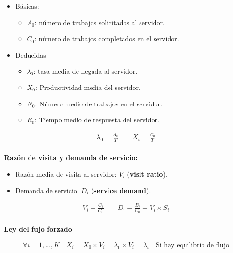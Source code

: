 \documentclass[a4paper,12pt]{article}
\begin{document}
\begin{itemize}
    \item Básicas:
    \begin{itemize}
        \item $A_0$: número de trabajos solicitados al servidor.
        \item $C_0$: número de trabajos completados en el servidor.
    \end{itemize}
    \item Deducidas:
    \begin{itemize}
        \item $\lambda_0$: tasa media de llegada al servidor.
        \item $X_0$: Productividad media del servidor.
        \item $N_0$: Número medio de trabajos en el servidor.
        \item $R_0$: Tiempo medio de respuesta del servidor. 
    \end{itemize}
\end{itemize}
\begin{tcolorbox}[colback=yellow!5!white, colframe=yellow!75!black]
    \begin{align*}
        \lambda_0 = \frac{A_0}{T} \quad \quad X_i = \frac{C_0}{T} \\
    \end{align*}
\end{tcolorbox}

\newpage
\textbf{Razón de visita y demanda de servicio:}

\begin{itemize}
    \item Razón media de visita al servidor: $V_i$ (\textbf{visit ratio}).
    \item Demanda de servicio: $D_i$ (\textbf{service demand}).
\end{itemize}


\begin{tcolorbox}[colback=yellow!5!white, colframe=yellow!75!black]
    \begin{align*}
        V_i = \frac{C_i}{C_0} \quad \quad D_i = \frac{B_i}{C_0} = V_i \times S_i \\
    \end{align*}
\end{tcolorbox}

\textbf{Ley del fujo forzado}

\begin{tcolorbox}[colback=yellow!5!white, colframe=yellow!75!black]
    \begin{align*}
        \forall i = 1, \ldots, K \quad X_i = X_0 \times V_i = \lambda_0 \times V_i = \lambda_i \quad \text{Si hay equilibrio de flujo}\\  
    \end{align*}
\end{tcolorbox}
\end{document}
